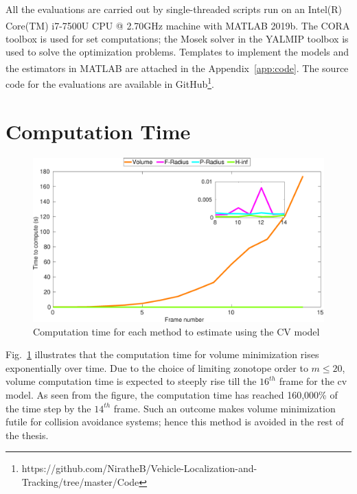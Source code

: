 All the evaluations are carried out by single-threaded scripts run on an Intel(R) Core(TM) i7-7500U CPU @ 2.70GHz machine with MATLAB\textsuperscript{\tiny\textregistered} 2019b. The CORA toolbox is used for set computations; the Mosek solver in the YALMIP toolbox is used to solve the optimization problems. Templates to implement the models and the estimators in MATLAB\textsuperscript{\tiny\textregistered} are attached in the Appendix~\ref{app:code}. The source code for the evaluations are available in GitHub\footnote{https://github.com/NiratheB/Vehicle-Localization-and-Tracking/tree/master/Code}.

\section{Computation Time}
\begin{figure}[H]
\centering
\includegraphics[width=\linewidth]{figures/timegraphh}
\caption{Computation time for each method to estimate using the CV model}
\label{fig:timegraph}
\end{figure}
Fig.~\ref{fig:timegraph} illustrates that the computation time for volume minimization rises exponentially over time. Due to the choice of limiting zonotope order to $m\leq20$, volume computation time is expected to steeply rise till the $16^{th}$ frame for the cv model. As seen from the figure, the computation time has reached 160,000\% of the time step by the $14^{th}$ frame. Such an outcome makes volume minimization futile for collision avoidance systems; hence this method is avoided in the rest of the thesis.

